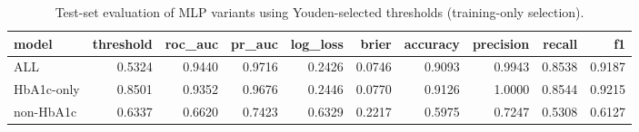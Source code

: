\begin{table}[H]
\begin{center}
\begin{tabular}{lrrrrrrrrr}
\toprule
model & threshold & roc_auc & pr_auc & log_loss & brier & accuracy & precision & recall & f1 \\
\midrule
ALL & 0.5324 & 0.9440 & 0.9716 & 0.2426 & 0.0746 & 0.9093 & 0.9943 & 0.8538 & 0.9187 \\
HbA1c-only & 0.8501 & 0.9352 & 0.9676 & 0.2446 & 0.0770 & 0.9126 & 1.0000 & 0.8544 & 0.9215 \\
non-HbA1c & 0.6337 & 0.6620 & 0.7423 & 0.6329 & 0.2217 & 0.5975 & 0.7247 & 0.5308 & 0.6127 \\
\bottomrule
\end{tabular}
\end{center}
\vspace{-5pt}
\caption{Test-set evaluation of MLP variants using Youden-selected thresholds (training-only selection).}
\label{tab:mlp_test_eval_youden}
\end{table}

